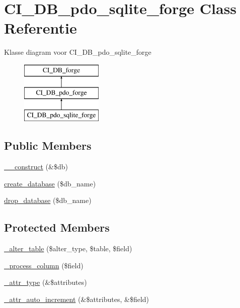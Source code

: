 \hypertarget{class_c_i___d_b__pdo__sqlite__forge}{}\section{C\+I\+\_\+\+D\+B\+\_\+pdo\+\_\+sqlite\+\_\+forge Class Referentie}
\label{class_c_i___d_b__pdo__sqlite__forge}
Klasse diagram voor C\+I\+\_\+\+D\+B\+\_\+pdo\+\_\+sqlite\+\_\+forge\begin{figure}[H]
\begin{center}
\leavevmode
\includegraphics[height=3.000000cm]{class_c_i___d_b__pdo__sqlite__forge}
\end{center}
\end{figure}
\subsection*{Public Members}
\begin{DoxyCompactItemize}
\item 
\mbox{\hyperlink{class_c_i___d_b__pdo__sqlite__forge_aaf2ef772755ec6f361d44e16cc9ffd69}{\+\_\+\+\_\+construct}} (\&\$db)
\item 
\mbox{\hyperlink{class_c_i___d_b__pdo__sqlite__forge_a902a7267babceb2ce595706f217e00ad}{create\+\_\+database}} (\$db\+\_\+name)
\item 
\mbox{\hyperlink{class_c_i___d_b__pdo__sqlite__forge_a9612987b2d4230de2638d15857e92e67}{drop\+\_\+database}} (\$db\+\_\+name)
\end{DoxyCompactItemize}
\subsection*{Protected Members}
\begin{DoxyCompactItemize}
\item 
\mbox{\hyperlink{class_c_i___d_b__pdo__sqlite__forge_a41c6cae02f2fda8b429ad0afb9509426}{\+\_\+alter\+\_\+table}} (\$alter\+\_\+type, \$table, \$field)
\item 
\mbox{\hyperlink{class_c_i___d_b__pdo__sqlite__forge_a8f38f1c5b5dddecca4befbe393f3f299}{\+\_\+process\+\_\+column}} (\$field)
\item 
\mbox{\hyperlink{class_c_i___d_b__pdo__sqlite__forge_a8553be952084c6f7cdfff370a1d14f6b}{\+\_\+attr\+\_\+type}} (\&\$attributes)
\item 
\mbox{\hyperlink{class_c_i___d_b__pdo__sqlite__forge_a2a013a5932439c3c44f0dad3436525f7}{\+\_\+attr\+\_\+auto\+\_\+increment}} (\&\$attributes, \&\$field)
\end{DoxyCompactItemize}
